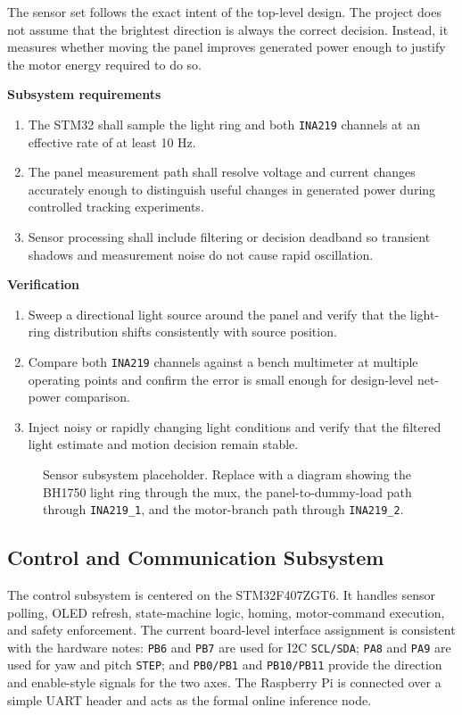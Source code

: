 \documentclass[11pt]{article}
\begin{document}
The sensor set follows the exact intent of the top-level design. The project does not assume that the brightest direction is always the correct decision. Instead, it measures whether moving the panel improves generated power enough to justify the motor energy required to do so.

\textbf{Subsystem requirements}
\begin{enumerate}[label=\arabic*.]
\item The STM32 shall sample the light ring and both \texttt{INA219} channels at an effective rate of at least 10 Hz.
\item The panel measurement path shall resolve voltage and current changes accurately enough to distinguish useful changes in generated power during controlled tracking experiments.
\item Sensor processing shall include filtering or decision deadband so transient shadows and measurement noise do not cause rapid oscillation.
\end{enumerate}

\textbf{Verification}
\begin{enumerate}[label=\arabic*.]
\item Sweep a directional light source around the panel and verify that the light-ring distribution shifts consistently with source position.
\item Compare both \texttt{INA219} channels against a bench multimeter at multiple operating points and confirm the error is small enough for design-level net-power comparison.
\item Inject noisy or rapidly changing light conditions and verify that the filtered light estimate and motion decision remain stable.
\end{enumerate}

\begin{figure}[H]
\centering
\fbox{\rule{0pt}{2.0in}\rule{0.86\linewidth}{0pt}}
\caption{Sensor subsystem placeholder. Replace with a diagram showing the BH1750 light ring through the mux, the panel-to-dummy-load path through \texttt{INA219\_1}, and the motor-branch path through \texttt{INA219\_2}.}
\label{fig:sensing}
\end{figure}

\subsection{Control and Communication Subsystem}
The control subsystem is centered on the STM32F407ZGT6. It handles sensor polling, OLED refresh, state-machine logic, homing, motor-command execution, and safety enforcement. The current board-level interface assignment is consistent with the hardware notes: \texttt{PB6} and \texttt{PB7} are used for I2C \texttt{SCL/SDA}; \texttt{PA8} and \texttt{PA9} are used for yaw and pitch \texttt{STEP}; and \texttt{PB0/PB1} and \texttt{PB10/PB11} provide the direction and enable-style signals for the two axes. The Raspberry Pi is connected over a simple UART header and acts as the formal online inference node.
\end{document}
